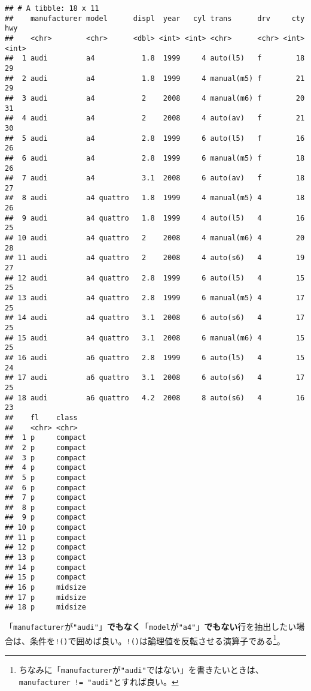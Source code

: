 \documentclass[]{book}
\newenvironment{Shaded}{\begin{snugshade}}{\end{snugshade}}
\newcommand{\KeywordTok}[1]{\textcolor[rgb]{0.13,0.29,0.53}{\textbf{#1}}}
\newcommand{\StringTok}[1]{\textcolor[rgb]{0.31,0.60,0.02}{#1}}
\newcommand{\OperatorTok}[1]{\textcolor[rgb]{0.81,0.36,0.00}{\textbf{#1}}}
\newcommand{\NormalTok}[1]{#1}
\let\rmarkdownfootnote\footnote%
\def\footnote{\protect\rmarkdownfootnote}
\begin{document}
\begin{verbatim}
## # A tibble: 18 x 11
##    manufacturer model      displ  year   cyl trans      drv     cty   hwy
##    <chr>        <chr>      <dbl> <int> <int> <chr>      <chr> <int> <int>
##  1 audi         a4           1.8  1999     4 auto(l5)   f        18    29
##  2 audi         a4           1.8  1999     4 manual(m5) f        21    29
##  3 audi         a4           2    2008     4 manual(m6) f        20    31
##  4 audi         a4           2    2008     4 auto(av)   f        21    30
##  5 audi         a4           2.8  1999     6 auto(l5)   f        16    26
##  6 audi         a4           2.8  1999     6 manual(m5) f        18    26
##  7 audi         a4           3.1  2008     6 auto(av)   f        18    27
##  8 audi         a4 quattro   1.8  1999     4 manual(m5) 4        18    26
##  9 audi         a4 quattro   1.8  1999     4 auto(l5)   4        16    25
## 10 audi         a4 quattro   2    2008     4 manual(m6) 4        20    28
## 11 audi         a4 quattro   2    2008     4 auto(s6)   4        19    27
## 12 audi         a4 quattro   2.8  1999     6 auto(l5)   4        15    25
## 13 audi         a4 quattro   2.8  1999     6 manual(m5) 4        17    25
## 14 audi         a4 quattro   3.1  2008     6 auto(s6)   4        17    25
## 15 audi         a4 quattro   3.1  2008     6 manual(m6) 4        15    25
## 16 audi         a6 quattro   2.8  1999     6 auto(l5)   4        15    24
## 17 audi         a6 quattro   3.1  2008     6 auto(s6)   4        17    25
## 18 audi         a6 quattro   4.2  2008     8 auto(s6)   4        16    23
##    fl    class  
##    <chr> <chr>  
##  1 p     compact
##  2 p     compact
##  3 p     compact
##  4 p     compact
##  5 p     compact
##  6 p     compact
##  7 p     compact
##  8 p     compact
##  9 p     compact
## 10 p     compact
## 11 p     compact
## 12 p     compact
## 13 p     compact
## 14 p     compact
## 15 p     compact
## 16 p     midsize
## 17 p     midsize
## 18 p     midsize
\end{verbatim}

「\texttt{manufacturer}が\texttt{"audi"}」\textbf{でもなく}「\texttt{model}が\texttt{"a4"}」\textbf{でもない}行を抽出したい場合は、条件を\texttt{!()}で囲めば良い。\texttt{!()}は論理値を反転させる演算子である\footnote{ちなみに「\texttt{manufacturer}が\texttt{"audi"}ではない」を書きたいときは、\texttt{manufacturer\ !=\ "audi"}とすれば良い。}。

\begin{Shaded}
\end{Shaded}
\end{document}
